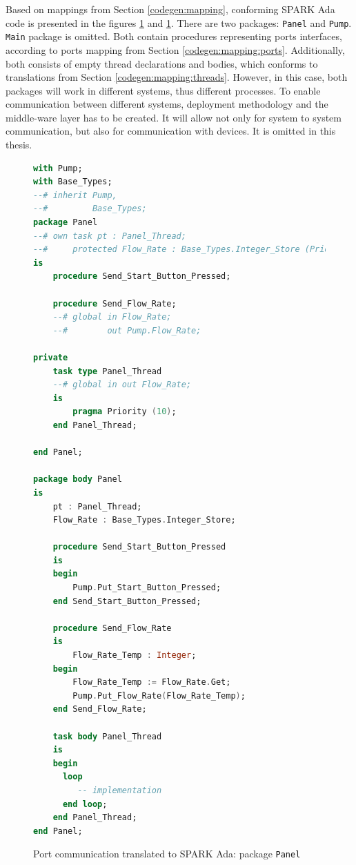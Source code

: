 Based on mappings from Section \ref{codegen:mapping}, conforming SPARK Ada code is presented in the figures \ref{listing:port_communication_spark_panel} and \ref{listing:port_communication_spark_panel}. There are two packages: \lstinline{Panel} and \lstinline{Pump}. \lstinline{Main} package is omitted. Both contain procedures representing ports interfaces, according to ports mapping from Section \ref{codegen:mapping:ports}. Additionally, both consists of empty thread declarations and bodies, which conforms to translations from Section \ref{codegen:mapping:threads}. However, in this case, both packages will work in different systems, thus different processes.  To enable communication between different systems, deployment methodology and the middle-ware layer has to be created. It will allow not only for system to system communication, but also for communication with devices. It is omitted in this thesis.

\begin{figure}[ht]
\singlespacing
\begin{lstlisting}[language=ada, frame=single, gobble=0]
with Pump;
with Base_Types;
--# inherit Pump,
--#         Base_Types;
package Panel
--# own task pt : Panel_Thread;
--#     protected Flow_Rate : Base_Types.Integer_Store (Priority => 10);
is
    procedure Send_Start_Button_Pressed;

    procedure Send_Flow_Rate;
    --# global in Flow_Rate;
    --#        out Pump.Flow_Rate;

private
    task type Panel_Thread
    --# global in out Flow_Rate;
    is
        pragma Priority (10);
    end Panel_Thread;

end Panel;

package body Panel
is
    pt : Panel_Thread;
    Flow_Rate : Base_Types.Integer_Store;

    procedure Send_Start_Button_Pressed
    is
    begin
        Pump.Put_Start_Button_Pressed;
    end Send_Start_Button_Pressed;

    procedure Send_Flow_Rate
    is
        Flow_Rate_Temp : Integer;
    begin
        Flow_Rate_Temp := Flow_Rate.Get;
        Pump.Put_Flow_Rate(Flow_Rate_Temp);
    end Send_Flow_Rate;

    task body Panel_Thread
    is
    begin
      loop
         -- implementation
      end loop;      
    end Panel_Thread;
end Panel;
\end{lstlisting} 
\doublespacing
\caption{Port communication translated to SPARK Ada: package \lstinline{Panel}}
\label{listing:port_communication_spark_panel}
\end{figure}

